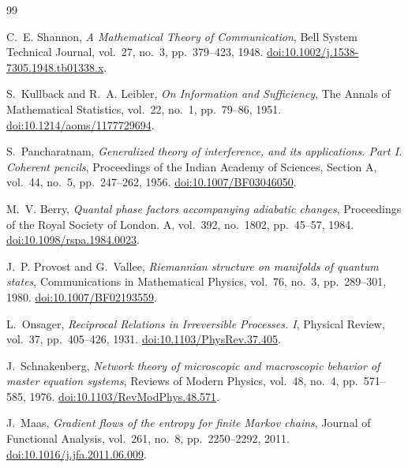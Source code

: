 \documentclass[11pt]{book}
\begin{document}
\backmatter
\renewcommand{\bibname}{References}
\begin{thebibliography}{99}

C.~E. Shannon,
\emph{A Mathematical Theory of Communication},
Bell System Technical Journal, vol.~27, no.~3, pp.~379--423, 1948.
\href{https://doi.org/10.1002/j.1538-7305.1948.tb01338.x}{doi:10.1002/j.1538-7305.1948.tb01338.x}.

S.~Kullback and R.~A. Leibler,
\emph{On Information and Sufficiency},
The Annals of Mathematical Statistics, vol.~22, no.~1, pp.~79--86, 1951.
\href{https://doi.org/10.1214/aoms/1177729694}{doi:10.1214/aoms/1177729694}.

S.~Pancharatnam,
\emph{Generalized theory of interference, and its applications. Part I. Coherent pencils},
Proceedings of the Indian Academy of Sciences, Section A, vol.~44, no.~5, pp.~247--262, 1956.
\href{https://doi.org/10.1007/BF03046050}{doi:10.1007/BF03046050}.

M.~V. Berry,
\emph{Quantal phase factors accompanying adiabatic changes},
Proceedings of the Royal Society of London. A, vol.~392, no.~1802, pp.~45--57, 1984.
\href{https://doi.org/10.1098/rspa.1984.0023}{doi:10.1098/rspa.1984.0023}.

J.~P. Provost and G.~Vallee,
\emph{Riemannian structure on manifolds of quantum states},
Communications in Mathematical Physics, vol.~76, no.~3, pp.~289--301, 1980.
\href{https://doi.org/10.1007/BF02193559}{doi:10.1007/BF02193559}.

L.~Onsager,
\emph{Reciprocal Relations in Irreversible Processes. I},
Physical Review, vol.~37, pp.~405--426, 1931.
\href{https://doi.org/10.1103/PhysRev.37.405}{doi:10.1103/PhysRev.37.405}.

J.~Schnakenberg,
\emph{Network theory of microscopic and macroscopic behavior of master equation systems},
Reviews of Modern Physics, vol.~48, no.~4, pp.~571--585, 1976.
\href{https://doi.org/10.1103/RevModPhys.48.571}{doi:10.1103/RevModPhys.48.571}.

J.~Maas,
\emph{Gradient flows of the entropy for finite Markov chains},
Journal of Functional Analysis, vol.~261, no.~8, pp.~2250--2292, 2011.
\href{https://doi.org/10.1016/j.jfa.2011.06.009}{doi:10.1016/j.jfa.2011.06.009}.


\end{thebibliography}
\end{document}
